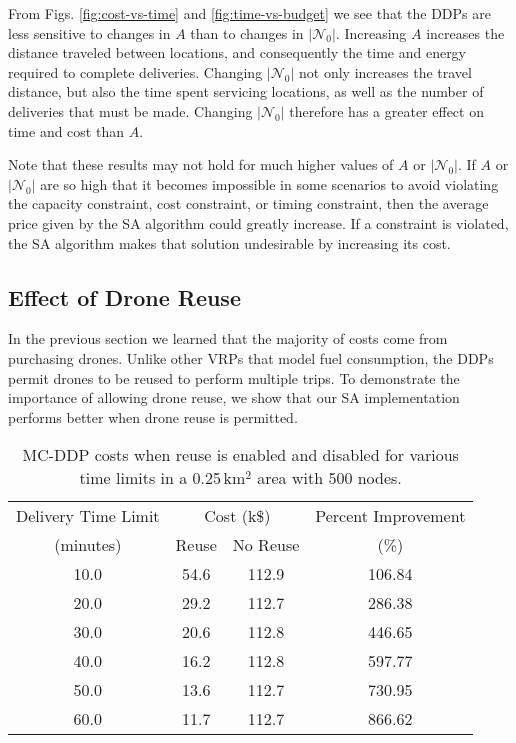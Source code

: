 \documentclass[journal]{IEEEtran}
\begin{document}
From Figs. \ref{fig:cost-vs-time} and \ref{fig:time-vs-budget} we see that the DDPs are less sensitive to changes in ${\ensuremath{A}}$ than to changes in $|{\ensuremath{{\ensuremath{\mathcal{N}}}_{0}}}{}|$. Increasing ${\ensuremath{A}}$ increases the distance traveled between locations, and consequently the time and energy required to complete deliveries. Changing $|{\ensuremath{{\ensuremath{\mathcal{N}}}_{0}}}{}|$ not only increases the travel distance, but also the time spent servicing locations, as well as the number of deliveries that must be made. Changing $|{\ensuremath{{\ensuremath{\mathcal{N}}}_{0}}}{}|$ therefore has a greater effect on time and cost than ${\ensuremath{A}}$. 

Note that these results may not hold for much higher values of ${\ensuremath{A}}$ or $|{\ensuremath{{\ensuremath{\mathcal{N}}}_{0}}}{}|$. If ${\ensuremath{A}}$ or $|{\ensuremath{{\ensuremath{\mathcal{N}}}_{0}}}{}|$ are so high that it becomes impossible in some scenarios to avoid violating the capacity constraint, cost constraint, or timing constraint, then the average price given by the SA algorithm could greatly increase. If a constraint is violated, the SA algorithm makes that solution undesirable by increasing its cost.

\subsection{Effect of Drone Reuse}
\label{ssec:drone-reuse}

In the previous section we learned that the majority of costs come from purchasing drones. Unlike other VRPs that model fuel consumption, the DDPs permit drones to be reused to perform multiple trips. To demonstrate the importance of allowing drone reuse, we show that our SA implementation performs better when drone reuse is permitted.

\begin{table}[t!]             
\centering                    
\caption{MC-DDP costs when reuse is enabled and disabled for various time limits in a 0.25\,km$^2$ area with 500 nodes.}      
\label{table:MCDDP-reuse}    
\begin{tabular}{|c|c c|c|}
\hline
 Delivery Time Limit & \multicolumn{2}{c|}{Cost (k\$)} & Percent Improvement  \\ 
(minutes) & Reuse & No Reuse &  (\%)  \\
\hline
10.0 & 54.6 & 112.9 & 106.84 \\
20.0 & 29.2 & 112.7 & 286.38 \\
30.0 & 20.6 & 112.8 & 446.65 \\
40.0 & 16.2 & 112.8 & 597.77 \\
50.0 & 13.6 & 112.7 & 730.95 \\
60.0 & 11.7 & 112.7 & 866.62 \\
\hline
\end{tabular}                 
\end{table}   
\end{document}
